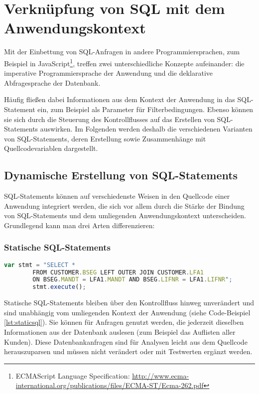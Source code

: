\section{Verkn{\"u}pfung von SQL mit dem Anwendungskontext}\label{sec:dependencydetection}

%
%

Mit der Einbettung von SQL-Anfragen in andere Programmiersprachen, zum Beispiel in JavaScript\footnote{ECMAScript Language
Specification: \url{http://www.ecma-international.org/publications/files/ECMA-ST/Ecma-262.pdf}}, treffen zwei unterschiedliche Konzepte aufeinander: die imperative Programmiersprache der Anwendung und die deklarative Abfragesprache der Datenbank.

Häufig fließen dabei Informationen aus dem Kontext der Anwendung in das SQL-Statement ein, zum Beispiel als Parameter für Filterbedingungen.
Ebenso können sie sich durch die Steuerung des Kontrollflusses auf das Erstellen von SQL-Statements auswirken.
Im Folgenden werden deshalb die verschiedenen Varianten von SQL-Statements, deren Erstellung sowie Zusammenhänge mit Quellcodevariablen dargestellt.

\subsection{Dynamische Erstellung von SQL-Statements}
SQL-Statements können auf verschiedenste Weisen in den Quellcode einer Anwendung integriert werden, die sich vor allem durch die Stärke der Bindung von SQL-Statements und dem umliegenden Anwendungskontext unterscheiden.
Grundlegend kann man drei Arten differenzieren:

\subsubsection{Statische SQL-Statements}

	\begin{lstlisting}[caption={Statisches SQL-Statement eingebettet im Quellcode}, label={lst:staticsql}, language=JavaScript]
		var stmt = "SELECT *
		FROM CUSTOMER.BSEG LEFT OUTER JOIN CUSTOMER.LFA1
		ON BSEG.MANDT = LFA1.MANDT AND BSEG.LIFNR = LFA1.LIFNR";
		stmt.execute();
	\end{lstlisting}

Statische SQL-Statements bleiben über den Kontrollfluss hinweg unverändert und sind unabhängig vom umliegenden Kontext der Anwendung (siehe Code-Beispiel \ref{lst:staticsql}).
Sie können für Anfragen genutzt werden, die jederzeit dieselben Informationen aus der Datenbank auslesen (zum Beispiel das Auflisten aller Kunden).
Diese Datenbankanfragen sind für Analysen leicht aus dem Quellcode herauszuparsen und müssen nicht verändert oder mit Testwerten ergänzt werden.


